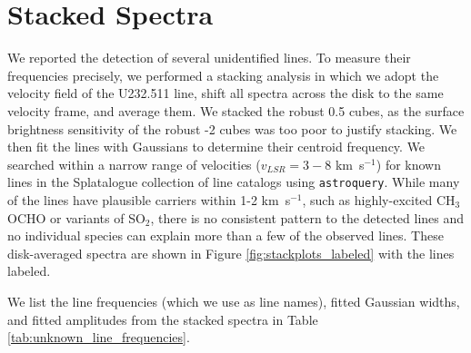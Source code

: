 \documentclass[twocolumn]{aastex61}
\newcommand{\kms}{\textrm{km~s}\ensuremath{^{-1}}\xspace}	%
\begin{document}
\section{Stacked Spectra}
\label{appendix:stackedspectra}
We reported the detection of several unidentified lines.
To measure their frequencies precisely, we performed a stacking
analysis in which we adopt the velocity field of the U232.511 line,
shift all spectra across the disk to the same velocity frame, and average them.
We stacked the robust 0.5 cubes, as the surface brightness sensitivity
of the robust -2 cubes was too poor to justify stacking.
We then fit the lines with Gaussians to determine their centroid frequency.
We searched within a narrow range of velocities ($v_{LSR}=3-8$ \kms)
for known lines in the Splatalogue collection of line catalogs using
\texttt{astroquery}.
While many of the lines have plausible carriers within 1-2 \kms, such as
highly-excited CH$_3$OCHO or variants of SO$_2$, there is no consistent pattern
to the detected lines and no individual species can explain more than a few of
the observed lines.  These disk-averaged spectra are shown in Figure \ref{fig:stackplots_labeled}
with the lines labeled.

We list the line frequencies (which we use as line names), fitted Gaussian
widths, and fitted amplitudes from the stacked spectra in Table
\ref{tab:unknown_line_frequencies}.
\end{document}
